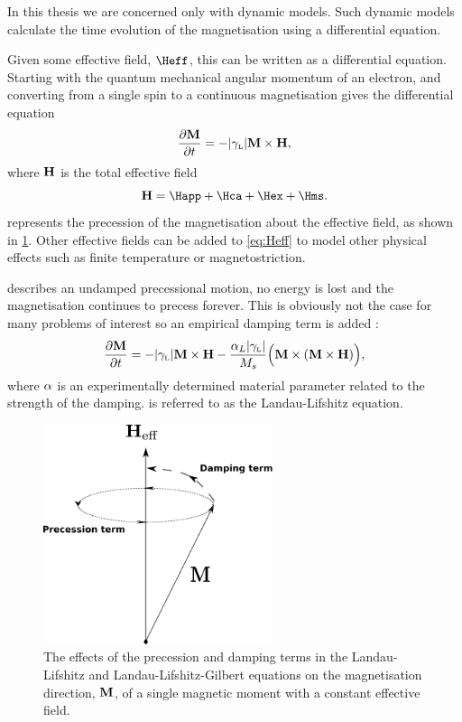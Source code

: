 In this thesis we are concerned only with dynamic models.
Such dynamic models calculate the time evolution of the magnetisation using a differential equation.

Given some effective field, $\Heff$, this can be written as a differential equation. 
Starting with the quantum mechanical angular momentum of an electron, and converting from a single spin to a continuous magnetisation gives the differential equation \cite{Kronmuller2003}
\begin{equation}
  \label{eq:38}
  \frac{\partial \mathbf{M}}{\partial t} = - {\left|{\gamma_{\text{\tiny{L}}}} \right|} \mathbf{M} \times \mathbf{H},
\end{equation}
where $\mathbf{H}$ is the total effective field
\begin{equation}
  \Hv = \Happ + \Hca + \Hex + \Hms.
  \label{eq:Heff}
\end{equation}
 represents the precession of the magnetisation about the effective field, as shown in \cref{fig:LLG-terms}. Other effective fields can be added to \cref{eq:Heff} to model other physical effects such as finite temperature or magnetostriction.

 describes an undamped precessional motion, \ie no energy is lost and the magnetisation continues to precess forever. This is obviously not the case for many problems of interest so an empirical damping term is added \cite{Landau1935}:
\begin{equation}
  \label{eq:LL}
  \frac{\partial \mathbf{M}}{\partial t} = - {\left|{\gamma_{\text{\tiny{L}}}} \right|} \mathbf{M} \times \mathbf{H} - \frac{\alpha_L {\left|{\gamma_{\text{\tiny{L}}}} \right|}}{M_s} \Big( \mathbf{M} \times (\mathbf{M} \times \mathbf{H}) \Big),
\end{equation}
where $\alpha$ is an experimentally determined material parameter related to the strength of the damping.  is referred to as the Landau-Lifshitz equation.

\begin{figure}
  \centering
  \includegraphics[width=0.6\textwidth]{./images/LLG-terms}
  \caption{The effects of the precession and damping terms in the Landau-Lifshitz and Landau-Lifshitz-Gilbert equations on the magnetisation direction, $\mathbf{M}$, of a single magnetic moment with a constant effective field.}
  \label{fig:LLG-terms}
\end{figure}


